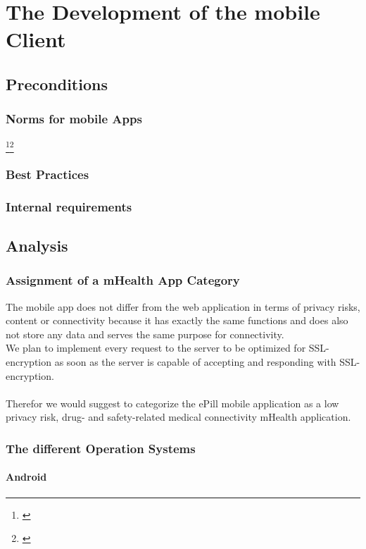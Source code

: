\section{The Development of the mobile Client}
\subsection{Preconditions}
\subsubsection{Norms for mobile Apps}
\footnote{\cite{BundesregierungderBundesrepublikDeutschland.01.03.2007}}\footnote{\cite{BundesregierungderBundesrepublikDeutschland.01.08.1996}}

\subsubsection{Best Practices}
\subsubsection{Internal requirements}
\subsection{Analysis}
\subsubsection{Assignment of a mHealth App Category}
The mobile app does not differ from the web application in terms of privacy risks, content or connectivity because it has exactly the same functions and does also not store any data and serves the same purpose for connectivity.
\\
We plan to implement every request to the server to be optimized for SSL-encryption as soon as the server is capable of accepting and responding with SSL-encryption. 
\\
\\
Therefor we would suggest to categorize the ePill mobile application as a low privacy risk, drug- and safety-related medical connectivity mHealth application.

\subsubsection{The different Operation Systems}
\paragraph{Android}
